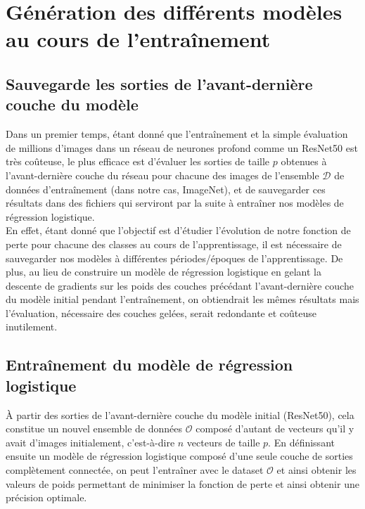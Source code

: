 \documentclass[12pt,english, openany]{book}
\begin{document}
\section{Génération des différents modèles au cours de l'entraînement}


\subsection{Sauvegarde les sorties de l'avant-dernière couche du modèle}

Dans un premier temps, étant donné que l'entraînement et la simple évaluation de millions d'images dans un réseau de neurones profond comme un ResNet50 est très coûteuse, le plus efficace est d'évaluer les sorties de taille $p$ obtenues à l'avant-dernière couche du réseau pour chacune des images de l'ensemble  $\mathcal{D}$ de données d'entraînement (dans notre cas, ImageNet), et de sauvegarder ces résultats dans des fichiers qui serviront par la suite à entraîner nos modèles de régression logistique.\\

En effet, étant donné que l'objectif est d'étudier l'évolution de notre fonction de perte pour chacune des classes au cours de l'apprentissage, il est nécessaire de sauvegarder nos modèles à différentes périodes/époques de l'apprentissage. De plus, au lieu de construire un modèle de régression logistique en gelant la descente de gradients sur les poids des couches précédant l'avant-dernière couche du modèle initial pendant l'entraînement, on obtiendrait les mêmes résultats mais l'évaluation, nécessaire des couches gelées, serait redondante et coûteuse inutilement.


\subsection{Entraînement du modèle de régression logistique}

À partir des sorties de l'avant-dernière couche du modèle initial (ResNet50), cela constitue un nouvel ensemble de données $\mathcal{O}$ composé d'autant de vecteurs qu'il y avait d'images initialement, c’est-à-dire $n$ vecteurs de taille $p$. En définissant ensuite un modèle de régression logistique composé d'une seule couche de sorties complètement connectée, on peut l'entraîner avec le dataset $\mathcal{O}$ et ainsi obtenir les valeurs de poids permettant de minimiser la fonction de perte et ainsi obtenir une précision optimale.\\
\end{document}
